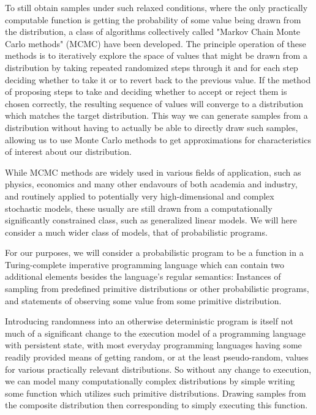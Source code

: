 To still obtain samples under such relaxed conditions, where the only practically computable function is getting the probability of some value being drawn from the distribution, a class of algorithms collectively called "Markov Chain Monte Carlo methods" (MCMC) have been developed. The principle operation of these methods is to iteratively explore the space of values that might be drawn from a distribution by taking repeated randomized steps through it and for each step deciding whether to take it or to revert back to the previous value. If the method of proposing steps to take and deciding whether to accept or reject them is chosen correctly, the resulting sequence of values will converge to a distribution which matches the target distribution. This way we can generate samples from a distribution without having to actually be able to directly draw such samples, allowing us to use Monte Carlo methods to get approximations for characteristics of interest about our distribution.

While MCMC methods are widely used in various fields of application, such as physics, economics and many other endavours of both academia and industry, and routinely applied to potentially very high-dimensional and complex stochastic models, these usually are still drawn from a computationally significantly constrained class, such as generalized linear models. We will here consider a much wider class of models, that of probabilistic programs.

For our purposes, we will consider a probabilistic program to be a function in a Turing-complete imperative programming language which can contain two additional elements besides the language's regular semantics: Instances of sampling from predefined primitive distributions or other probabilistic programs, and statements of observing some value from some primitive distribution.

Introducing randomness into an otherwise deterministic program is itself not much of a significant change to the execution model of a programming language with persistent state, with most everyday programming languages having some readily provided means of getting random, or at the least pseudo-random, values for various practically relevant distributions. So without any change to execution, we can model many computationally complex distributions by simple writing some function which utilizes such primitive distributions. Drawing samples from the composite distribution then corresponding to simply executing this function.


